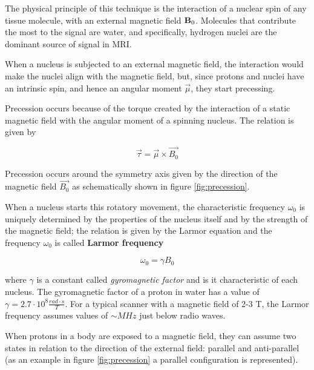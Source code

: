 \documentclass[11pt]{report}
\begin{document}
The physical principle of this technique is the interaction of a nuclear spin of any tissue molecule, with an external magnetic field $\textbf B_0$.
Molecules that contribute the most to the signal are water, and specifically, hydrogen nuclei are the dominant source of signal in MRI.

When a nucleus is subjected to an external magnetic field, the interaction would make the nuclei align with the magnetic field, but, since protons and nuclei have an intrinsic spin, and hence an angular moment $\overrightarrow{\mu}$, they start precessing.

Precession occurs because of the torque created by the interaction of a static magnetic field with the angular moment of a spinning nucleus.
The relation is given by

\begin{equation}
\overrightarrow{\tau} = \overrightarrow{\mu} \times \overrightarrow{B_0}
\end{equation}

Precession occurs around the symmetry axis given by the direction of the magnetic field $\overrightarrow{B_0}$ as schematically shown in figure \ref{fig:precession}.

When a nucleus starts this rotatory movement, the characteristic frequency $\omega_0$ is uniquely determined by the properties of the nucleus itself and by the strength of the magnetic field; the relation is given by the Larmor equation and the frequency $\omega_0$ is called \textbf{Larmor frequency}

\begin{equation}\label{eq:Larmorfrequency}
\omega_0 = \gamma B_0
\end{equation}

where  $\gamma$ is a constant called \emph{gyromagnetic factor} and is it characteristic of each nucleus.
The gyromagnetic factor of a proton in water has a value of $\gamma = 2.7\cdot 10^8 \frac{rad\cdot s}{T}$.
For a typical scanner with a magnetic field of 2-3 T, the Larmor frequency assumes values of $\sim MHz$ just below radio waves.

When protons in a body are exposed to a magnetic field, they can assume two states in relation to the direction of the external field: parallel and anti-parallel (as an example in figure \ref{fig:precession} a parallel configuration is represented).
\end{document}
